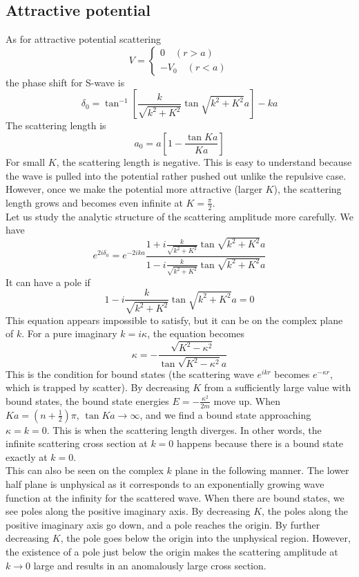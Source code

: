 \subsection{Attractive potential}
As for attractive potential scattering
\[V = \begin{cases} 0 \quad (r > a) \\ -V_0 \quad (r < a)\end{cases}\]
the phase shift for S-wave is
\[\delta_0 = \tan^{-1} \left[\frac{k}{\sqrt{k^2+K^2}} \tan\sqrt{k^2+K^2}a \right]-ka\]
The scattering length is
\[a_0 = a\left[ 1 - \frac{\tan Ka}{Ka} \right] \]
For small $K$, the scattering length is negative. This is easy to understand because the wave is pulled into the potential rather pushed out unlike the repulsive case. However, once we
make the potential more attractive (larger $K$), the scattering length grows and becomes even infinite at $K = \frac{\pi}{2}$.
\\
Let us study the analytic structure of the scattering amplitude more carefully. We have
\[e^{2i\delta_0} = e^{-2ika} \frac{1 + i \frac{k}{\sqrt{k^2+K^2}} \tan\sqrt{k^2+K^2}a}{1 - i \frac{k}{\sqrt{k^2+K^2}} \tan\sqrt{k^2+K^2}a}\]
It can have a pole if
\[1 - i \frac{k}{\sqrt{k^2+K^2}} \tan\sqrt{k^2+K^2}a = 0\]
This equation appears impossible to satisfy, but it can be on the complex plane of $k$. For a pure imaginary $k = i\kappa$, the equation becomes
\[\kappa = - \frac{\sqrt{K^2-\kappa^2}}{\tan \sqrt{K^2-\kappa^2}a}\]
This is the condition for bound states (the scattering wave $e^{ikr}$ becomes $e^{-\kappa r}$, which is trapped by scatter). By decreasing $K$ from a sufficiently large value with bound states, the bound state energies $E = -\frac{\kappa^2}{2m}$ move up. When $Ka = (n + \frac{1}{2})\pi$, $\tan Ka \to \infty$, and we find a bound state approaching $\kappa = k = 0$. 
This is when the scattering length diverges. In other words, the infinite scattering cross section at $k = 0$ happens because there is a bound state exactly at $ k = 0$.\\
This can also be seen on the complex $k$ plane in the following manner. The lower half plane is unphysical as it corresponds to an exponentially growing wave function at the infinity for the scattered wave. 
When there are bound states, we see poles along the positive imaginary axis. By decreasing $K$, the poles along the positive imaginary axis go down, and a pole reaches the origin. 
By further decreasing $K$, the pole goes below the origin into the unphysical region. 
However, the existence of a pole just below the origin makes the scattering amplitude at $k \to 0$ large and results in an anomalously large cross section. 

